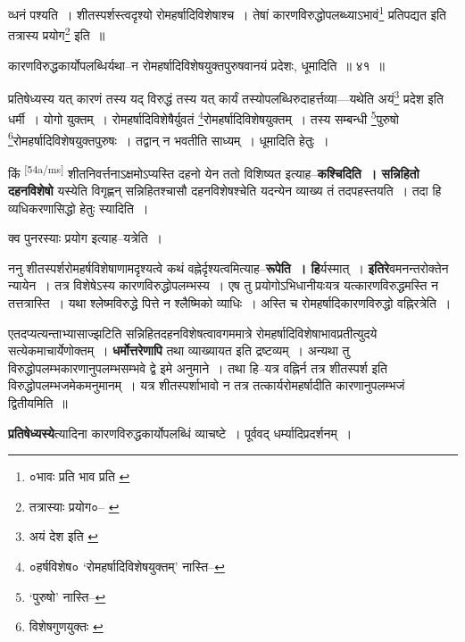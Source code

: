 \documentclass[article,12pt,a4paper]{memoir}
\begin{document}
	  \pstart व्धनं पश्यति । शीतस्पर्शस्त्वदृश्यो रोमहर्षादिविशेषाश्च । तेषां कारणविरुद्धोपलब्ध्याऽभावं\footnote{०भावः प्रति \cite{dp-edP} \cite{dp-edH} \cite{dp-edE} \cite{dp-edN} भाव प्रति \cite{dp-msA}} प्रतिपद्यत इति तत्रास्य प्रयोग\footnote{तत्रास्याः प्रयोग०--\cite{dp-msA} \cite{dp-msB} \cite{dp-msC} \cite{dp-msD} \cite{dp-edP} \cite{dp-edH} \cite{dp-edE} \cite{dp-edN}} इति ॥
	\pend
       

	  \pstart कारणविरुद्धकार्योपलब्धिर्यथा--न रोमहर्षादिविशेषयुक्तपुरुषवानयं प्रदेशः, धूमादिति ॥ ४१ ॥
	\pend
       

	  \pstart प्रतिषेध्यस्य यत् कारणं तस्य यद् विरुद्धं तस्य यत् कार्यं तस्योपलब्धिरुदाहर्त्तव्या—यथेति अयं\footnote{अयं देश इति \cite{dp-msA} \cite{dp-edP} \cite{dp-edH} \cite{dp-edE} \cite{dp-edN}} प्रदेश इति धर्मी । योगो युक्तम् । रोमहर्षादिविशेषैर्युवतं \footnote{०हर्षविशेष० \cite{dp-msC} ‘रोमहर्षादिविशेषयुक्तम्’ नास्ति--\cite{dp-msB}}रोमहर्षादिविशेषयुक्तम् । तस्य सम्बन्धी \footnote{‘पुरुषो’ नास्ति--\cite{dp-msC}}पुरुषो \footnote{विशेषगुणयुक्तः \cite{dp-msB}}रोमहर्षादिविशेषयुक्तपुरुषः । तद्वान् न भवतीति साध्यम् । धूमादिति हेतुः ।
	\pend
      

	  \pstart किं \leavevmode\textsuperscript{\rmlatinfont\tiny [54a/ms]} शीतनिवर्त्तनाऽक्षमोऽप्यस्ति दहनो येन ततो विशिष्यत इत्याह--\textbf{कश्चिदिति । सन्निहितो दहनविशेषो} यस्येति विगृह्णन् सन्निहितश्चासौ दहनविशेषश्चेति यदन्येन व्याख्य तं तदपहस्तयति । तदा हि व्यधिकरणासिद्धो हेतुः स्यादिति ।
	\pend
      

	  \pstart क्व पुनरस्याः प्रयोग इत्याह--यत्रेति ।
	\pend
      

	  \pstart ननु शीतस्पर्शरोमहर्षविशेषाणामदृश्यत्वे कथं वह्नेर्दृश्यत्वमित्याह--\textbf{रूपेति । हि}र्यस्मात् । \textbf{इतिरे}वमनन्तरोक्तेन न्यायेन । तत्र विशेषेऽस्य कारणविरुद्धोपलम्भस्य । एष तु प्रयोगोऽभिधानीयःयत्र यत्कारणविरुद्धमस्ति न तत्तत्रास्ति । यथा श्लेष्मविरुद्धे पित्ते न श्लैष्मिको व्याधिः । अस्ति च रोमहर्षादिकारणविरुद्धो वह्निरत्रेति ।
	\pend
      

	  \pstart एतदप्यत्यन्ताभ्यासाज्झटिति सन्निहितदहनविशेषत्वावगममात्रे रोमहर्षादिविशेषाभावप्रतीत्युदये सत्येकमाचार्येणोक्तम् । \textbf{धर्मोत्तरेणापि} तथा व्याख्यायत इति द्रष्टव्यम् । अन्यथा तु विरुद्धोपलम्भकारणानुपलम्भसम्भवे द्वे इमे अनुमाने । तथा हि--यत्र वह्निर्न तत्र शीतस्पर्श इति विरुद्धोपलम्भजमेकमनुमानम् । यत्र शीतस्पर्शाभावो न तत्र तत्कार्यरोमहर्षादीति कारणानुपलम्भजं द्वितीयमिति ॥
	\pend
      

	  \pstart \textbf{प्रतिषेध्यस्ये}त्यादिना कारणविरुद्धकार्योपलब्धिं व्याचष्टे । पूर्ववद् धर्म्यादिप्रदर्शनम् ।
	\pend
      
\end{document}
